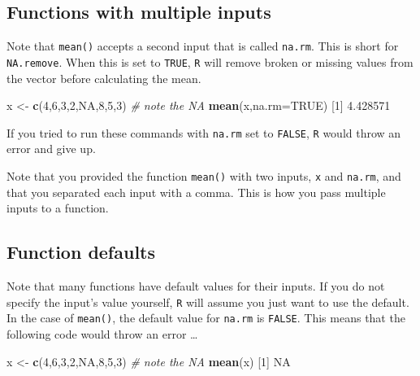 \documentclass[
]{book}
\newenvironment{Shaded}{\begin{snugshade}}{\end{snugshade}}
\newcommand{\AttributeTok}[1]{\textcolor[rgb]{0.13,0.29,0.53}{#1}}
\newcommand{\CommentTok}[1]{\textcolor[rgb]{0.56,0.35,0.01}{\textit{#1}}}
\newcommand{\ConstantTok}[1]{\textcolor[rgb]{0.56,0.35,0.01}{#1}}
\newcommand{\DecValTok}[1]{\textcolor[rgb]{0.00,0.00,0.81}{#1}}
\newcommand{\FloatTok}[1]{\textcolor[rgb]{0.00,0.00,0.81}{#1}}
\newcommand{\FunctionTok}[1]{\textcolor[rgb]{0.13,0.29,0.53}{\textbf{#1}}}
\newcommand{\NormalTok}[1]{#1}
\newcommand{\OtherTok}[1]{\textcolor[rgb]{0.56,0.35,0.01}{#1}}
\begin{document}
\subsection*{Functions with multiple inputs}\label{functions-with-multiple-inputs}

Note that \texttt{mean()} accepts a second input that is called \texttt{na.rm}. This is short for \texttt{NA.remove}. When this is set to \texttt{TRUE}, \texttt{R} will remove broken or missing values from the vector before calculating the mean.

\begin{Shaded}
\begin{Highlighting}[]
\NormalTok{x }\OtherTok{\textless{}{-}} \FunctionTok{c}\NormalTok{(}\DecValTok{4}\NormalTok{,}\DecValTok{6}\NormalTok{,}\DecValTok{3}\NormalTok{,}\DecValTok{2}\NormalTok{,}\ConstantTok{NA}\NormalTok{,}\DecValTok{8}\NormalTok{,}\DecValTok{5}\NormalTok{,}\DecValTok{3}\NormalTok{)  }\CommentTok{\# note the NA}
\FunctionTok{mean}\NormalTok{(x,}\AttributeTok{na.rm=}\ConstantTok{TRUE}\NormalTok{)}
\NormalTok{[}\DecValTok{1}\NormalTok{] }\FloatTok{4.428571}
\end{Highlighting}
\end{Shaded}

If you tried to run these commands with \texttt{na.rm} set to \texttt{FALSE}, \texttt{R} would throw an error and give up.

Note that you provided the function \texttt{mean()} with two inputs, \texttt{x} and \texttt{na.rm}, and that you separated each input with a comma. This is how you pass multiple inputs to a function.

\subsection*{Function defaults}\label{function-defaults}

Note that many functions have default values for their inputs. If you do not specify the input's value yourself, \texttt{R} will assume you just want to use the default. In the case of \texttt{mean()}, the default value for \texttt{na.rm} is \texttt{FALSE}. This means that the following code would throw an error \ldots{}

\begin{Shaded}
\begin{Highlighting}[]
\NormalTok{x }\OtherTok{\textless{}{-}} \FunctionTok{c}\NormalTok{(}\DecValTok{4}\NormalTok{,}\DecValTok{6}\NormalTok{,}\DecValTok{3}\NormalTok{,}\DecValTok{2}\NormalTok{,}\ConstantTok{NA}\NormalTok{,}\DecValTok{8}\NormalTok{,}\DecValTok{5}\NormalTok{,}\DecValTok{3}\NormalTok{)  }\CommentTok{\# note the NA}
\FunctionTok{mean}\NormalTok{(x)}
\NormalTok{[}\DecValTok{1}\NormalTok{] }\ConstantTok{NA}
\end{Highlighting}
\end{Shaded}
\end{document}
